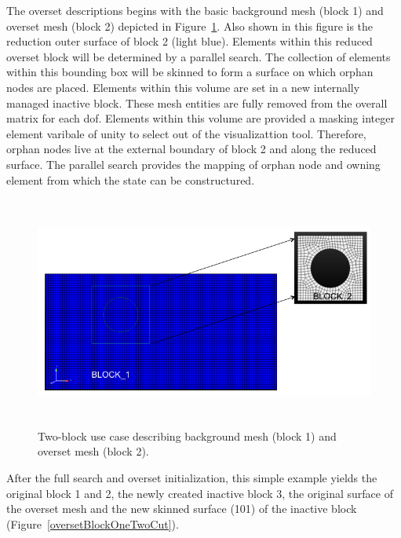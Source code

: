 The overset descriptions begins with the basic background mesh (block 1) and
overset mesh (block 2) depicted in Figure~\ref{oversetBlockOneTwo}. Also
shown in this figure is the reduction outer surface of block 2 (light blue).
Elements within this reduced overset block will be determined by a parallel 
search. The collection of elements within this bounding box will be skinned 
to form a surface on which orphan nodes are placed. Elements within this volume
are set in a new internally managed inactive block. These mesh entities are 
fully removed from the overall matrix for each dof. Elements within this
volume are provided a masking integer element varibale of unity to select
out of the visualizattion tool. Therefore, orphan nodes live at the external 
boundary of block 2 and along the reduced surface. The parallel search provides
the mapping of orphan node and owning element from which the state can be 
constructured.

\begin{figure} [h]
\centerline{\includegraphics[height=3.0in]{images/oversetBlockOneTwo}}
\vspace{0.1in}
\caption{Two-block use case describing background mesh (block 1) and 
overset mesh (block 2).}
\label{oversetBlockOneTwo}
\end{figure}

After the full search and overset initialization, this simple example yields
the original block 1 and 2, the newly created inactive block 3, the original
surface of the overset mesh and the new skinned surface (101) of the inactive
block (Figure~\ref{oversetBlockOneTwoCut}).

